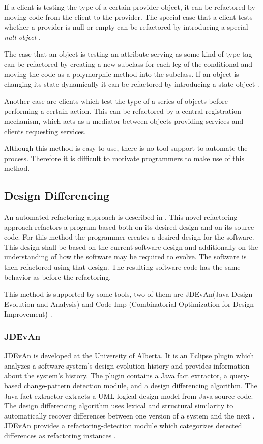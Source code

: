 \documentclass[conference,compsoc,a4paper]{IEEEtran}
\newcommand{\code}[1]{{\small\ttfamily #1}}
\newcommand{\JDEvAn}{\mbox{JDEvAn}\xspace}
\begin{document}
	If a client is testing the type of a certain provider object, it can be refactored by moving code from the client to 
	the provider. The special case that a client tests whether a provider is \code{null} or empty can be refactored by 
	introducing a special \emph{null object} \cite{nullobject}.
	
	The case that an object is testing an attribute serving as some kind of type-tag can be refactored by creating a new 
	subclass for each leg of the conditional and moving the code as a polymorphic method into the subclass. If an object is 
	changing its state dynamically it can be refactored by introducing a state object \cite[pp.~305--313]{designpatterns}.
	
	Another case are clients which test the type of a series of objects before performing a certain action. This can be 
	refactored by a central registration mechanism, which acts as a mediator between objects providing services and clients 
	requesting services.
	
	Although this method is easy to use, there is no tool support to automate the process. Therefore it is difficult to 
	motivate programmers to make use of this method.
	
	\subsection{Design Differencing}
	
	An automated refactoring approach is described in \cite{design-diff}. This novel refactoring approach refactors a 
	program based both on its desired design and on its source code.
	For this method the programmer creates a desired design for the software. This design shall be based on the current 
	software design and additionally on the understanding of how the software may be required to evolve. The software is 
	then refactored using that design. The resulting software code has the same behavior as before the refactoring.
	
	This method is supported by some tools, two of them are \JDEvAn (Java Design Evolution and Analysis) \cite{JDEvAn} and 
	Code-Imp (Combinatorial Optimization for Design Improvement) \cite{DBLP:journals/jss/OKeeffeC08, 
		DBLP:conf/icse/MoghadamC11}.
	
	\subsubsection{JDEvAn}
	
	\JDEvAn is developed at the University of Alberta. It is an Eclipse plugin which analyzes a software system's 
	design-evolution history and provides information about the system's history. The plugin contains a Java fact 
	extractor, a query-based change-pattern detection module, and a design differencing algorithm. The Java fact extractor 
	extracts a UML logical design model from Java source code. The design differencing algorithm uses lexical and 
	structural similarity to automatically recover differences between one version of a system and the next \cite{Xing2007}.
	\JDEvAn provides a refactoring-detection module which categorizes detected differences as refactoring instances 
	\cite{DBLP:conf/wcre/XingS06}.
	
\end{document}
